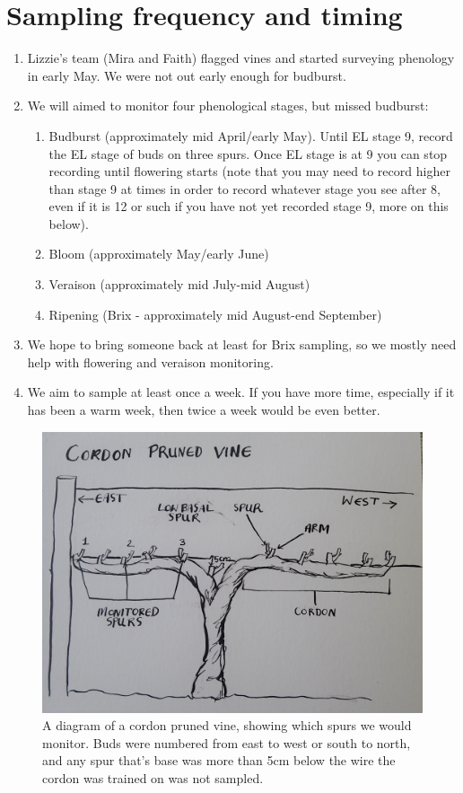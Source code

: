 \documentclass[11pt,letter]{article}
\begin{document}
\section{Sampling frequency and timing}
\begin{enumerate}
  \item Lizzie's team (Mira and Faith) flagged vines and started surveying phenology in early May. We were not out early enough for budburst. 
  \item We will aimed to monitor four phenological stages, but missed budburst:
  \begin{enumerate}
	\item Budburst (approximately mid April/early May). Until EL stage 9, record the EL stage of buds on three spurs. Once EL stage is at 9 you can stop recording until flowering starts (note that you may need to record higher than stage 9 at times in order to record whatever stage you see after 8, even if it is 12 or such if you have not yet recorded stage 9, more on this below).
	\item Bloom (approximately May/early June)
  	\item Veraison (approximately mid July-mid August)
  	\item Ripening (Brix - approximately mid August-end September)
  \end{enumerate}
  \item We hope to bring someone back at least for Brix sampling, so we mostly need help with flowering and veraison monitoring. 
  \item We aim to sample at least once a week. If you have more time, especially if it has been a warm week, then twice a week would be even better.

\end{enumerate}


\begin{figure}%
  \includegraphics[width=\linewidth]{CordonPruned.jpg}
  \caption{A diagram of a cordon pruned vine, showing which spurs we would monitor. Buds were numbered from east to west or south to north, and any spur that's base was more than 5cm below the wire the cordon was trained on was not sampled.}
  \label{fig:CordonPruned}
\end{figure}
\end{document}
